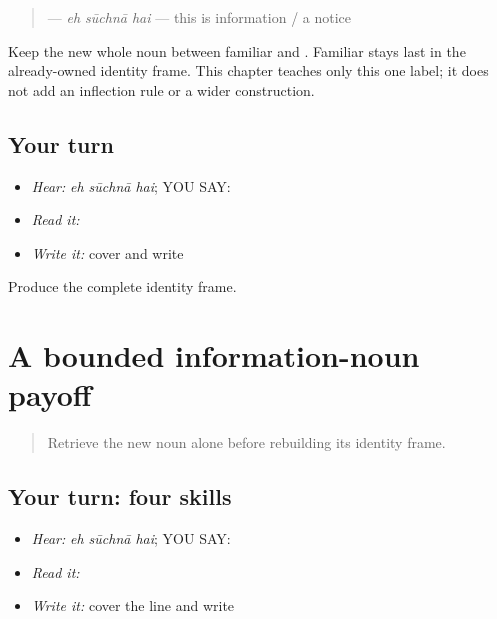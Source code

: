 \begin{grammarlens}[title={Grammar Lens}]
\begin{quote}
\textbf{  } — \emph{eh sūchnā hai} — this is information / a notice
\end{quote}

Keep the new whole noun between familiar \textbf{} and \textbf{}. Familiar \textbf{} stays last in the already-owned identity frame. This chapter teaches only this one label; it does not add an inflection rule or a wider construction.
\end{grammarlens}

\subsection*{Your turn}
\begin{itemize}
\raggedright
  \item \emph{Hear:} \emph{eh sūchnā hai}; YOU SAY: \textbf{  }
  \item \emph{Read it:} \textbf{  }
  \item \emph{Write it:} cover and write \textbf{  }
\end{itemize}

\begin{tcolorbox}[breakable,colback=teal!4,colframe=teal!35!black,title={Before you move on}]
Produce the complete identity frame.
\end{tcolorbox}
\section[\texorpdfstring{\pa{ਇਹ} \pa{ਸੂਚਨਾ} \pa{ਹੈ} (eh suchnaa hai)}{ਇਹ ਸੂਚਨਾ ਹੈ (eh suchnaa hai)}]{A bounded information-noun payoff}

\label{lesson:PA-C199-payoff}



\begin{quote}
Retrieve the new noun alone before rebuilding its identity frame.
\end{quote}

\subsection*{Your turn: four skills}
\begin{itemize}
\raggedright
  \item \emph{Hear:} \emph{eh sūchnā hai}; YOU SAY: \textbf{  }
  \item \emph{Read it:} \textbf{  }
  \item \emph{Write it:} cover the line and write \textbf{  }
\end{itemize}

